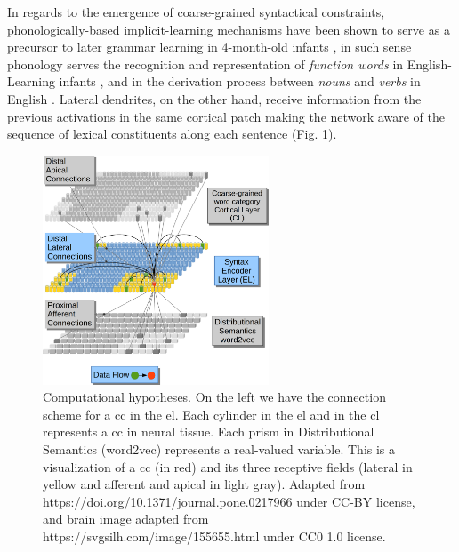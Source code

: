 {In regards to the emergence of coarse-grained syntactical constraints, phonologically-based implicit-learning mechanisms have been shown to serve as a precursor to later grammar learning in 4-month-old infants \cite{10.1371/journal.pone.0017920}, in such sense phonology serves the recognition and representation of \emph{function words} in English-Learning infants \cite{doi:10.1207/s15327078in1002_5}, and in the derivation process between \emph{nouns} and \emph{verbs} in English \cite{lohmann_phonological_2017}.
Lateral dendrites, on the other hand, receive information from the previous activations in the same cortical patch making the network aware of the sequence of lexical constituents along each sentence (Fig. \ref{fig:EncoderConnections}).

\begin{figure}[ht!]
    \centering
    \includegraphics[width=0.6\textwidth]{EncoderConnections.png}
    \caption{Computational hypotheses.
    On the left we have the connection scheme for a \gls{cc} in the \gls{el}.
	    Each cylinder in the \gls{el} and in the \gls{cl} represents a \gls{cc} in neural tissue.
	    Each prism in Distributional Semantics (word2vec) represents a real-valued variable.
	    This is a visualization of a \gls{cc} (in red) and its three receptive fields (lateral in yellow and afferent and apical in light gray).
	Adapted from https://doi.org/10.1371/journal.pone.0217966 under CC-BY license, and
        brain image adapted from https://svgsilh.com/image/155655.html under CC0 1.0 license.}
    \label{fig:EncoderConnections}
\end{figure}

}
